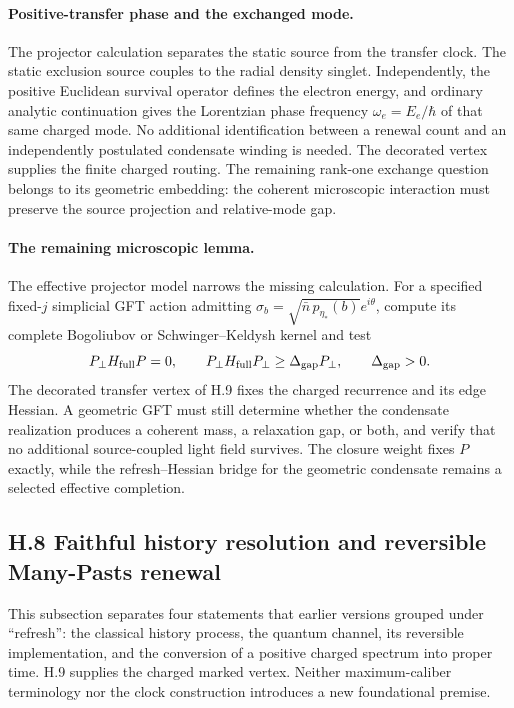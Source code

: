 \documentclass[11pt]{article}
\begin{document}
\paragraph{Positive-transfer phase and the exchanged mode.}
The projector calculation separates the static source from the transfer clock. The static exclusion source couples to the radial density singlet. Independently, the positive Euclidean survival operator defines the electron energy, and ordinary analytic continuation gives the Lorentzian phase frequency $\omega_e=E_e/\hbar$ of that same charged mode. No additional identification between a renewal count and an independently postulated condensate winding is needed. The decorated vertex supplies the finite charged routing. The remaining rank-one exchange question belongs to its geometric embedding: the coherent microscopic interaction must preserve the source projection and relative-mode gap.

\paragraph{The remaining microscopic lemma.}
The effective projector model narrows the missing calculation. For a specified fixed-$j$ simplicial GFT action admitting $\sigma_b=\sqrt{\bar n\,p_{\eta_*}(b)}e^{i\theta}$, compute its complete Bogoliubov or Schwinger--Keldysh kernel and test
\[
P_\perp H_{\rm full}P=0,
\qquad
P_\perp H_{\rm full}P_\perp\ge\Delta_{\rm gap}P_\perp,
\qquad
\Delta_{\rm gap}>0.
\]
The decorated transfer vertex of H.9 fixes the charged recurrence and its edge Hessian. A geometric GFT must still determine whether the condensate realization produces a coherent mass, a relaxation gap, or both, and verify that no additional source-coupled light field survives. The closure weight fixes $P$ exactly, while the refresh--Hessian bridge for the geometric condensate remains a selected effective completion.

\subsection*{H.8 Faithful history resolution and reversible Many-Pasts renewal}

This subsection separates four statements that earlier versions grouped under ``refresh'': the classical history process, the quantum channel, its reversible implementation, and the conversion of a positive charged spectrum into proper time. H.9 supplies the charged marked vertex. Neither maximum-caliber terminology nor the clock construction introduces a new foundational premise.
\end{document}
